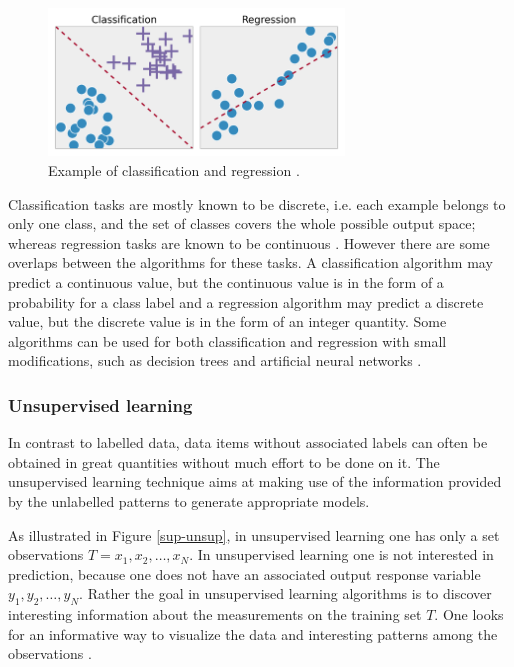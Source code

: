 \begin{figure}[H]
  \centering
    \includegraphics[width=0.7\textwidth]{images/RC.png}
    \caption{Example of classification and regression \citep{rossant2018ipython}.}
  \label{RC}
  
\end{figure}
Classification tasks are mostly known to be discrete, i.e. each example belongs to only one class, and the set of classes covers the whole possible output space; whereas regression tasks are known to be continuous \citep{stephen2009machine}. However there are some overlaps between the algorithms for these tasks. A classification algorithm may predict a continuous value, but the continuous value is in the form of a probability for a class label and a regression algorithm may predict a discrete value, but the discrete value is in the form of an integer quantity. Some algorithms can be used for both classification and regression with small modifications, such as decision trees and artificial neural networks \citep{brownlee2013prepare}.  

\subsubsection{Unsupervised learning}

In contrast to labelled data,  data items without associated labels can often be obtained in great quantities without much effort to be done on it. The unsupervised learning technique aims at making use of the information provided by the unlabelled patterns to generate appropriate models. 

As illustrated in Figure \ref{sup-unsup}, in unsupervised learning one has only a set observations $T=x_1,x_2,\dots, x_N$. In unsupervised learning one is not interested in prediction, because one does not have an associated output response variable $y_1,y_2,\dots, y_N$. Rather the goal in unsupervised learning algorithms is to discover interesting information about the measurements on the training set $T$. One looks for an informative way to visualize the data and interesting patterns among the observations \citep{james2013introduction}. 

